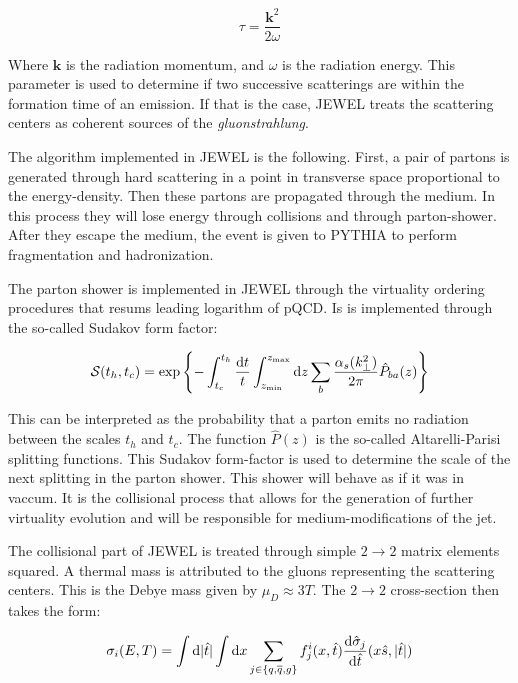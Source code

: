 \begin{equation}
\tau = \frac{\mathbf{k}^2}{2\omega}
\end{equation}

Where $\mathbf{k}$ is the radiation momentum, and $\omega$ is the radiation energy. This parameter is used to determine if two successive scatterings are within the formation time of an emission. If that is the case, JEWEL treats the scattering centers as coherent sources of the \emph{gluonstrahlung}.
\par
The algorithm implemented in JEWEL is the following. First, a pair of partons is generated through hard scattering in a point in transverse space proportional to the energy-density. Then these partons are propagated through the medium. In this process they will lose energy through collisions and through parton-shower. After they escape the medium, the event is given to PYTHIA\cite{sjostrand_pythia_2006} to perform fragmentation and hadronization.
\par
The parton shower is implemented in JEWEL through the virtuality ordering procedures that resums leading logarithm of pQCD. Is is implemented through the so-called Sudakov form factor:

\begin{equation}
\mathcal{S}(t_h,t_c) = \exp \left\{ -\int_{t_c}^{t_h} \frac{{\rm d} t}{t} \int_{z_{\rm min}}^{z_{\rm max}} {\rm d} z \sum_b \frac{\alpha_s (k_{\bot}^2)}{2\pi} \hat{P}_{ba} (z) \right\}
\end{equation}

This can be interpreted as the probability that a parton emits no radiation between the scales $t_h$ and $t_c$. The function $\hat{P}(z)$ is the so-called Altarelli-Parisi splitting functions. This Sudakov form-factor is used to determine the scale of the next splitting in the parton shower. This shower will behave as if it was in vaccum. It is the collisional process that allows for the generation of further virtuality evolution and will be responsible for medium-modifications of the jet.
\par
The collisional part of JEWEL is treated through simple $2 \rightarrow 2$ matrix elements squared. A thermal mass is attributed to the gluons representing the scattering centers. This is the Debye mass given by $\mu_D \approx 3T$. The $2 \rightarrow 2$ cross-section then takes the form:

\begin{equation}
\sigma_i (E,T) = \int {\rm d}|\hat{t}| \int {\rm d}x \sum_{j \in \{ q,\overline{q},g \}} f_{j}^{i} (x,\hat{t}) \frac{{\rm d}\hat{\sigma}_j}{{\rm d} \hat{t}} (x\hat{s}, |\hat{t}|)
\end{equation}

